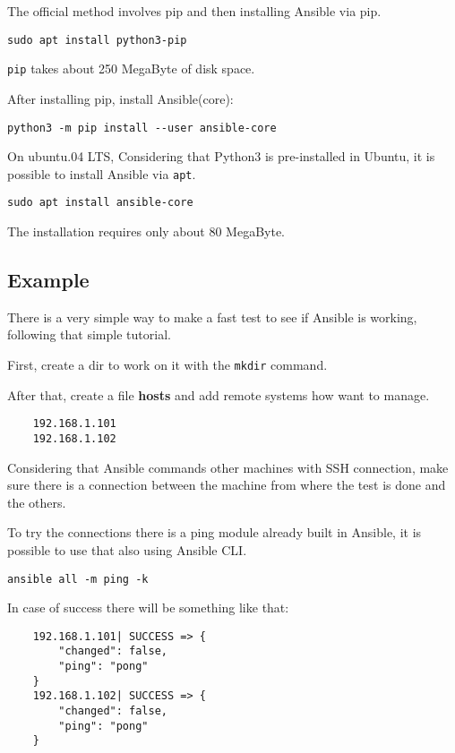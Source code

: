 \documentclass[12pt,a4paper,openright,twoside]{book}
\begin{document}
The official method involves pip and then installing Ansible via pip.
\begin{lstlisting}
sudo apt install python3-pip
\end{lstlisting}

\texttt{pip} takes about 250 MegaByte of disk space.

After installing pip, install Ansible(core):

\begin{lstlisting}
python3 -m pip install --user ansible-core
\end{lstlisting}

On ubuntu.04 LTS,
Considering that Python3 is pre-installed in Ubuntu, it is possible to install Ansible via \texttt{apt}.

\begin{lstlisting}
sudo apt install ansible-core
\end{lstlisting}

The installation requires only about 80 MegaByte.

\subsection{Example}

There is a very simple way to make a fast test to see if Ansible is working, following that simple tutorial\cite{ansibleRIP}.


First, create a dir to work on it with the \texttt{mkdir} command.


After that, create a file \textbf{hosts} and add remote systems how want to manage.
\begin{lstlisting}
    192.168.1.101
    192.168.1.102
\end{lstlisting}

Considering that Ansible commands other machines with SSH connection, make sure there is a connection between the machine from where the test is done and the others.

To try the connections there is a ping module already built in Ansible, it is possible to use that also using Ansible CLI.
\begin{lstlisting}
ansible all -m ping -k
\end{lstlisting}

In case of success there will be something like that:
\begin{lstlisting}
    192.168.1.101| SUCCESS => {
        "changed": false, 
        "ping": "pong"
    }
    192.168.1.102| SUCCESS => {
        "changed": false, 
        "ping": "pong"
    }
\end{lstlisting}
\end{document}
